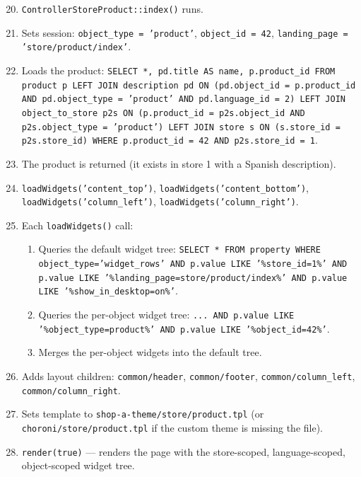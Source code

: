 \documentclass[11pt,a4paper]{article}
\begin{document}
\begin{enumerate}[leftmargin=1.6em,itemsep=2pt]
  \setcounter{enumi}{19}
  \item \texttt{ControllerStoreProduct::index()} runs.
  \item Sets session: \texttt{object\_type = 'product'},
        \texttt{object\_id = 42},
        \texttt{landing\_page = 'store/product/index'}.
  \item Loads the product:
        \texttt{SELECT *, pd.title AS name, p.product\_id FROM product
        p LEFT JOIN description pd ON (pd.object\_id = p.product\_id
        AND pd.object\_type = 'product' AND pd.language\_id = 2) LEFT
        JOIN object\_to\_store p2s ON (p.product\_id = p2s.object\_id
        AND p2s.object\_type = 'product') LEFT JOIN store s ON
        (s.store\_id = p2s.store\_id) WHERE p.product\_id = 42 AND
        p2s.store\_id = 1}.
  \item The product is returned (it exists in store 1 with a Spanish
        description).
  \item \texttt{loadWidgets('content\_top')}, \texttt{loadWidgets('content\_bottom')},
        \texttt{loadWidgets('column\_left')}, \texttt{loadWidgets('column\_right')}.
  \item Each \texttt{loadWidgets()} call:
        \begin{enumerate}[itemsep=2pt]
          \item Queries the default widget tree:
                \texttt{SELECT * FROM property WHERE
                object\_type='widget\_rows' AND
                p.value LIKE '\%store\_id=1\%' AND
                p.value LIKE '\%landing\_page=store/product/index\%'
                AND p.value LIKE '\%show\_in\_desktop=on\%'}.
          \item Queries the per-object widget tree:
                \texttt{... AND p.value LIKE
                '\%object\_type=product\%' AND p.value LIKE
                '\%object\_id=42\%'}.
          \item Merges the per-object widgets into the default tree.
        \end{enumerate}
  \item Adds layout children: \texttt{common/header},
        \texttt{common/footer}, \texttt{common/column\_left},
        \texttt{common/column\_right}.
  \item Sets template to \texttt{shop-a-theme/store/product.tpl} (or
        \texttt{choroni/store/product.tpl} if the custom theme is
        missing the file).
  \item \texttt{render(true)} --- renders the page with the
        store-scoped, language-scoped, object-scoped widget tree.
\end{enumerate}
\end{document}
